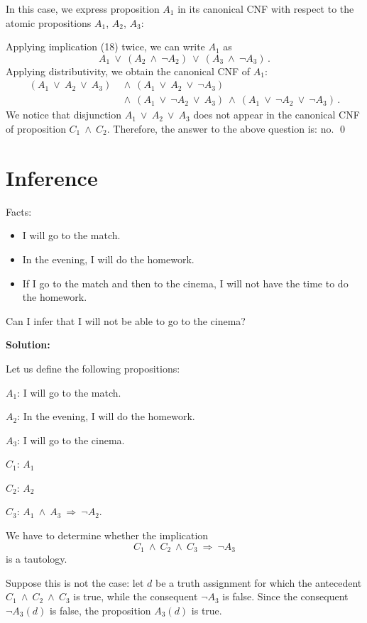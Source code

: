\documentclass[11pt,paper=b5,footinclude,headinclude]{scrbook} %
\def\ali {{~\vee~}}
\def\inn {{~\wedge~}}
\def\sledi {{~\Rightarrow~}}
\theoremstyle{remark}
\theoremstyle{definition} %
\theoremstyle{theorem} %
\begin{document}
In this case, we express proposition $A_1$ in its canonical CNF with respect to the atomic propositions $A_1$, $A_2$, $A_3$:

Applying implication (18) twice, we can write $A_1$ as
$$A_1\ali (A_2\inn \neg A_2)\ali (A_3\inn \neg A_3)\,.$$
Applying distributivity, we obtain the canonical CNF of $A_1$:
\begin{align*}
    (A_1\ali A_2\ali A_3)
    & \inn (A_1\ali A_2\ali \neg A_3)\\
    & \inn (A_1\ali \neg A_2\ali A_3)
    \inn (A_1\ali \neg A_2\ali \neg A_3)\,.
\end{align*}
We notice that disjunction $A_1\ali A_2\ali A_3$ does not appear in the canonical CNF of proposition $C_1\inn C_2$.
Therefore, the answer to the above question is: no. \qed


\section{Inference}

Facts:
\begin{itemize}
  \item I will go to the match.
  \item In the evening, I will do the homework.
  \item If I go to the match and then to the cinema, I will not have the time to do the homework.
\end{itemize}
Can I infer that I will not be able to go to the cinema?

\medskip
\textbf{ Solution:}

Let us define the following propositions:

$A_1$: I will go to the match.

$A_2$: In the evening, I will do the homework.

$A_3$: I will go to the cinema.

$C_1$: $A_1$

$C_2$: $A_2$

$C_3$: $A_1\inn A_3\sledi \neg A_2$.

We have to determine whether the implication
$$C_1\inn C_2\inn C_3\sledi \neg A_3$$
is a tautology.


Suppose this is not the case: let $d$ be a truth assignment for which the antecedent
$C_1\inn C_2\inn C_3$ is true,
while the consequent $\neg A_3$ is false.
Since the consequent $\neg A_3(d)$ is false, the proposition $A_3(d)$ is true.
\end{document}

